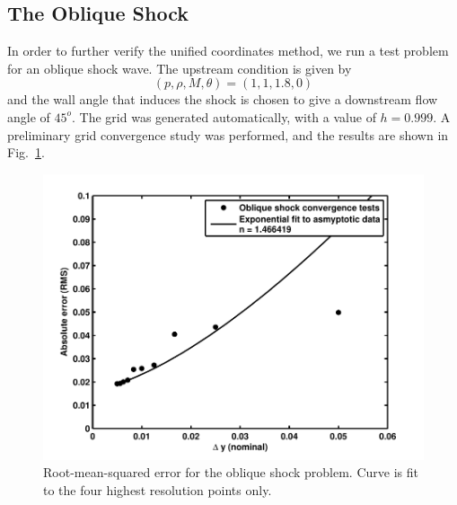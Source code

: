 \documentclass[12pt,letterpaper]{article}
\begin{document}
\subsection{The Oblique Shock}

In order to further verify the unified coordinates method, we run a test problem for an oblique shock wave. The upstream condition is given by 
\begin{equation}
\left(p,\rho,M,\theta\right)=\left(1,1,1.8,0\right)
\end{equation}
\noindent and the wall angle that induces the shock is chosen to give
a downstream flow angle of $45^o$. The grid was generated
automatically, with a value of $h = 0.999$. A preliminary grid
convergence study was performed, and the results are shown in
Fig.~\ref{fig:shock_convergence}.

\begin{figure}[htbp]
  \centering
  \includegraphics[width=\textwidth]{shock_convergence2.pdf}
  \caption[RMS for the Oblique Shock
  Problem]{Root-mean-squared error for the oblique shock
    problem. Curve is fit to the four highest resolution points
    only.}
  \label{fig:shock_convergence}
\end{figure}
\end{document}
